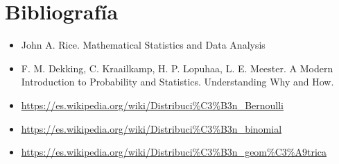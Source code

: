 \documentclass[
]{article}
\providecommand{\tightlist}{%
  \setlength{\itemsep}{0pt}\setlength{\parskip}{0pt}}
\begin{document}
\hypertarget{bibliografuxeda}{%
\section{Bibliografía}\label{bibliografuxeda}}

\begin{itemize}
\tightlist
\item
  John A. Rice. Mathematical Statistics and Data Analysis
\item
  F. M. Dekking, C. Kraailkamp, H. P. Lopuhaa, L. E. Meester. A Modern
  Introduction to Probability and Statistics. Understanding Why and How.
\item
  \url{https://es.wikipedia.org/wiki/Distribuci\%C3\%B3n_Bernoulli}
\item
  \url{https://es.wikipedia.org/wiki/Distribuci\%C3\%B3n_binomial}
\item
  \url{https://es.wikipedia.org/wiki/Distribuci\%C3\%B3n_geom\%C3\%A9trica}
\end{itemize}
\end{document}
